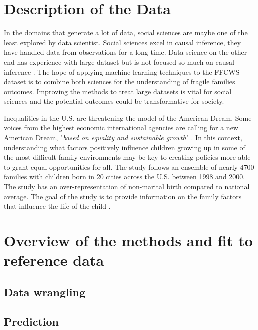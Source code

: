 \documentclass{article} %
\begin{document}
\section{Description of the Data}
In the domains that generate a lot of data, social sciences are maybe one of the least explored by data scientist. Social sciences excel in causal inference, they have handled data from observations for a long time. Data science on the other end has experience with large dataset but is not focused so much on causal inference \cite{grimmer2015we}. The hope of applying machine learning techniques to the FFCWS dataset is to combine both sciences for the understanding of fragile families outcomes. Improving the methods to treat large datasets is vital for social sciences and the potential outcomes could be transformative for society.

Inequalities in the U.S. are threatening the model of the American Dream. Some voices from the highest economic international agencies are calling for a new American Dream, "\textit{based on equality and sustainable growth}" \cite{wef2017}. In this context, understanding what factors positively influence children growing up in some of the most difficult family environments may be key to creating policies more able to grant equal opportunities for all. The study follows an ensemble of nearly 4700 families with children born in 20 cities across the U.S. between 1998 and 2000. The study has an over-representation of non-marital birth compared to national average. The goal of the study is to provide information on the family factors that influence the life of the child  \cite{reichman2001fragile}.


\section{Overview of the methods and fit to reference data}
\subsection{Data wrangling}
\subsection{Prediction}
\end{document}
